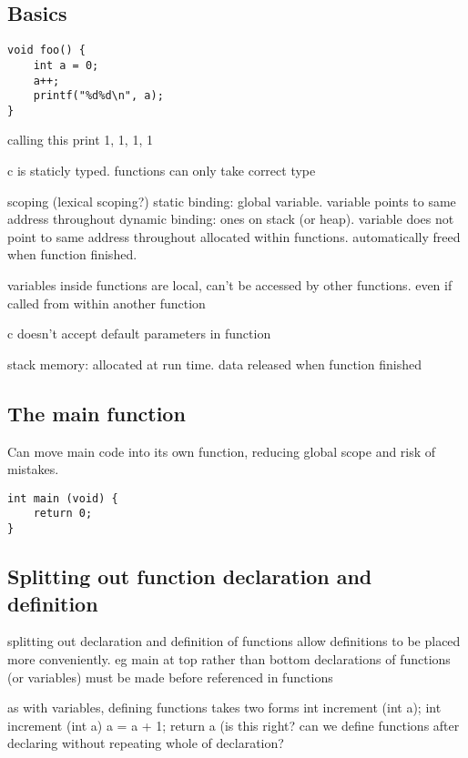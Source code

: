 
\subsection{Basics}


\begin{verbatim}
void foo() {
    int a = 0;
    a++;
    printf("%d%d\n", a);
}
\end{verbatim}

calling this print 1, 1, 1, 1

c is staticly typed. functions can only take correct type

scoping (lexical scoping?)
static binding: global variable. variable points to same address throughout
dynamic binding: ones on stack (or heap). variable does not point to same address throughout
allocated within functions. automatically freed when function finished.

variables inside functions are local, can't be accessed by other functions. even if called from within another function

c doesn't accept default parameters in function

stack memory: allocated at run time.
data released when function finished

\subsection{The main function}

Can move main code into its own function, reducing global scope and risk of mistakes.

\begin{verbatim}
int main (void) {
    return 0;
}
\end{verbatim}

\subsection{Splitting out function declaration and definition}

splitting out declaration and definition of functions allow definitions to be placed more conveniently. eg main at top rather than bottom
declarations of functions (or variables) must be made before referenced in functions

as with variables, defining functions takes two forms
int increment (int a);
int increment (int a) {a = a + 1; return a}
(is this right? can we define functions after declaring without repeating whole of declaration?

